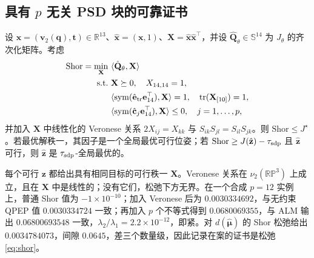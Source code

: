 \subsection{具有 $p$ 无关 PSD 块的可靠证书}\label{sec:cert}
\begin{lemma}\label{lem:cert}
设 $\mathbf x=(\mathbf v_2(\mathbf q),\mathbf t)\in\mathbb{R}^{13}$、$\hat{\mathbf x}=(\mathbf x,1)$、$\mathbf X=\hat{\mathbf x}\hat{\mathbf x}^\top$，并设 $\hat{\mathbf Q}_\theta\in\mathbb{S}^{14}$ 为 $J_\theta$ 的齐次化矩阵。考虑
\begin{equation}
\begin{aligned}
\mathrm{Shor}=\min_{\mathbf X}\ &\langle\hat{\mathbf Q}_\theta,\mathbf X\rangle\\
\text{s.t.}\ &\mathbf X\succeq0,\quad X_{14,14}=1,\\
&\langle\operatorname{sym}(\hat{\mathbf e}_{\rm tr}\mathbf e_{14}^\top),\mathbf X\rangle=1,\quad \operatorname{tr}(\mathbf X_{[10]})=1,\\
&\langle\operatorname{sym}(\hat{\mathbf c}_j\mathbf e_{14}^\top),\mathbf X\rangle\le0,\quad j=1,\dots,p,
\end{aligned}
\label{eq:shor}
\end{equation}
并加入 $\mathbf X$ 中线性化的 Veronese 关系 $2X_{ij}=X_{kk}$ 与 $S_{ik}S_{jl}=S_{il}S_{jk}$。则 $\mathrm{Shor}\le J^\star$。若最优解秩一，其因子是一个全局最优可行位姿；若 $\mathrm{Shor}\ge J(\hat{\mathbf z})-\tau_{\rm sdp}$ 且 $\hat{\mathbf z}$ 可行，则 $\hat{\mathbf z}$ 是 $\tau_{\rm sdp}$-全局最优的。
\end{lemma}
每个可行 $\mathbf z$ 都给出具有相同目标的可行秩一 $\mathbf X$。Veronese 关系在 $\nu_2(\mathbb{RP}^3)$ 上成立，且在 $\mathbf X$ 中是线性的；没有它们，松弛下方无界。在一个合成 $p=12$ 实例上，普通 Shor 值为 $-1\times10^{-10}$；加入 Veronese 后为 $0.0030334692$，与无约束 QPEP 值 $0.0030334724$ 一致；再加入 $p$ 个不等式得到 $\mathbf{0.0680069355}$，与 ALM 输出 $0.06800693548$ 一致，$\lambda_2/\lambda_1=2.2\times10^{-12}$，即紧。对 $d(\hat{\boldsymbol\mu})$ 的 Shor 松弛给出 $0.0034784073$，间隙 $0.0645$，差三个数量级，因此记录在案的证书是松弛 \eqref{eq:shor}。

